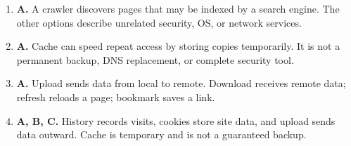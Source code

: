 \begin{enumerate}[label=\textbf{Q\arabic*.}, leftmargin=*]
\item \textbf{A.} A crawler discovers pages that may be indexed by a search engine. The other options describe unrelated security, OS, or network services.

\item \textbf{A.} Cache can speed repeat access by storing copies temporarily. It is not a permanent backup, DNS replacement, or complete security tool.

\item \textbf{A.} Upload sends data from local to remote. Download receives remote data; refresh reloads a page; bookmark saves a link.

\item \textbf{A, B, C.} History records visits, cookies store site data, and upload sends data outward. Cache is temporary and is not a guaranteed backup.

\end{enumerate}
